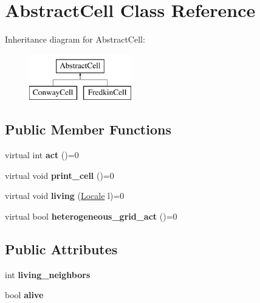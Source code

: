 \hypertarget{classAbstractCell}{\section{Abstract\-Cell Class Reference}
\label{classAbstractCell}
}
Inheritance diagram for Abstract\-Cell\-:\begin{figure}[H]
\begin{center}
\leavevmode
\includegraphics[height=2.000000cm]{classAbstractCell}
\end{center}
\end{figure}
\subsection*{Public Member Functions}
\begin{DoxyCompactItemize}
\item 
\hypertarget{classAbstractCell_a525a759bf4c2a9a70dec10d2569e1b93}{virtual int {\bfseries act} ()=0}\label{classAbstractCell_a525a759bf4c2a9a70dec10d2569e1b93}

\item 
\hypertarget{classAbstractCell_a6a54874737323dc8a67007e15ef35a40}{virtual void {\bfseries print\-\_\-cell} ()=0}\label{classAbstractCell_a6a54874737323dc8a67007e15ef35a40}

\item 
\hypertarget{classAbstractCell_ab9de226124a08d3f718c35785f92ed31}{virtual void {\bfseries living} (\hyperlink{structLocale}{Locale} l)=0}\label{classAbstractCell_ab9de226124a08d3f718c35785f92ed31}

\item 
\hypertarget{classAbstractCell_a7ff5f687d3245955dccc2653a872dc25}{virtual bool {\bfseries heterogeneous\-\_\-grid\-\_\-act} ()=0}\label{classAbstractCell_a7ff5f687d3245955dccc2653a872dc25}

\end{DoxyCompactItemize}
\subsection*{Public Attributes}
\begin{DoxyCompactItemize}
\item 
\hypertarget{classAbstractCell_ae61feab8faaed128353038f78e7072b2}{int {\bfseries living\-\_\-neighbors}}\label{classAbstractCell_ae61feab8faaed128353038f78e7072b2}

\item 
\hypertarget{classAbstractCell_aa92e42d5bb67f3249d8e2dde2c3228e7}{bool {\bfseries alive}}\label{classAbstractCell_aa92e42d5bb67f3249d8e2dde2c3228e7}

\end{DoxyCompactItemize}
